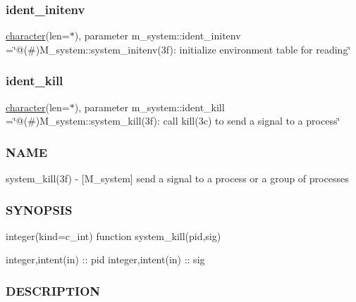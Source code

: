 \subsubsection{\texorpdfstring{ident\+\_\+initenv}{ident\_initenv}}
{\footnotesize\ttfamily \hyperlink{option__stopwatch_83_8txt_abd4b21fbbd175834027b5224bfe97e66}{character}(len=$\ast$), parameter m\+\_\+system\+::ident\+\_\+initenv =\char`\"{}@(\#)M\+\_\+system\+::system\+\_\+initenv(3f)\+: initialize environment table for reading\char`\"{}\hspace{0.3cm}{\ttfamily [private]}}

\mbox{\label{namespacem__system_a18b4c54ccbabc1d82affd798656ec9ae}} 
\subsubsection{\texorpdfstring{ident\+\_\+kill}{ident\_kill}}
{\footnotesize\ttfamily \hyperlink{option__stopwatch_83_8txt_abd4b21fbbd175834027b5224bfe97e66}{character}(len=$\ast$), parameter m\+\_\+system\+::ident\+\_\+kill =\char`\"{}@(\#)M\+\_\+system\+::system\+\_\+kill(3f)\+: call kill(3c) to send a signal to a process\char`\"{}\hspace{0.3cm}{\ttfamily [private]}}



\subsubsection*{N\+A\+ME}

system\+\_\+kill(3f) -\/ \mbox{[}M\+\_\+system\mbox{]} send a signal to a process or a group of processes 

\subsubsection*{S\+Y\+N\+O\+P\+S\+IS}

\begin{DoxyVerb}integer(kind=c_int) function system_kill(pid,sig)

   integer,intent(in) :: pid
   integer,intent(in) :: sig
\end{DoxyVerb}


\subsubsection*{D\+E\+S\+C\+R\+I\+P\+T\+I\+ON}

